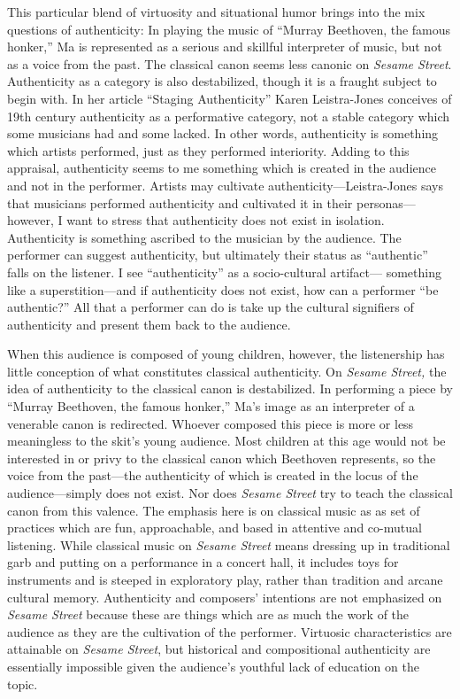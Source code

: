 \documentclass[12pt,letterpaper]{article}
\newcommand{\ses}{\textit{Sesame Street }}
\begin{document}
	This particular blend of virtuosity and situational
	humor brings into the mix questions of authenticity: In playing the
	music of ``Murray Beethoven, the famous honker,'' Ma is represented as a
	serious and skillful interpreter of music, but not as a voice from the 
	past. The classical canon seems less canonic on \textit{Sesame Street}.
	Authenticity as a category is also destabilized, though it is a fraught 	subject to begin with. 
        In her article ``Staging Authenticity'' Karen Leistra-Jones conceives of
	19th century authenticity as a performative category, not a stable 
	category which some musicians had and some 
	lacked.\autocite[400]{Jones2013} In other words, authenticity is 
	something which artists performed, just as they performed interiority. 
	Adding to this appraisal, authenticity seems to me something which is 
	created in the audience and not in the performer. Artists may cultivate
	authenticity---Leistra-Jones says that musicians performed authenticity
	and cultivated it in their personas---however, I want to stress that 
	authenticity does not exist in isolation. Authenticity is something 
	ascribed to the musician by the audience. The performer can suggest 
	authenticity, but ultimately their status as ``authentic'' falls on the 
	listener. I see ``authenticity'' as a socio-cultural artifact---
	something like a superstition---and if authenticity does not exist, how 
	can a performer ``be authentic?'' All that a performer can do is take 
	up the cultural signifiers of authenticity and present them back to the 
	audience.

        When this audience is composed of young children, however, the 
	listenership has little conception of what constitutes classical 
	authenticity. On \textit{Sesame Street,} the idea of authenticity to the
	classical canon is destabilized. In performing a piece by ``Murray 
	Beethoven, the famous honker,'' Ma's image as an interpreter of a 
	venerable canon is redirected. Whoever composed this piece is more or 
	less meaningless to the skit's young audience. Most children at this age
	would not be interested in or privy to the classical canon which 
	Beethoven 
	represents, so the voice from the past---the authenticity of which is 
	created in the locus of the audience---simply does not exist. Nor does 
	\textit{Sesame Street} try to teach the classical canon from this 
	valence. The emphasis here is on 
	classical music as as set of practices which are fun, approachable, and 	based in attentive and co-mutual listening. While classical music on 
	\ses means
	dressing up in traditional garb and putting on a performance in a 
	concert hall, it includes toys for instruments and is steeped in 
	exploratory play, rather than tradition and arcane cultural memory. 
	Authenticity and composers' 
	intentions are not emphasized on \textit{Sesame Street} because these 
	are things which are as much the work of the audience as they are the 
	cultivation of the performer. Virtuosic characteristics 
	are attainable on \textit{Sesame Street}, but historical and 
	compositional authenticity are essentially impossible given the 
	audience's youthful lack of education on the topic. 
\end{document}
